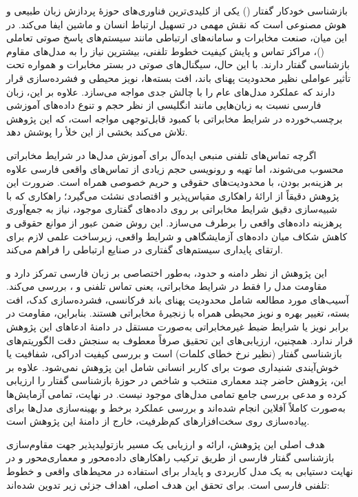 
بازشناسی خودکار گفتار () یکی از کلیدی‌ترین فناوری‌های حوزهٔ پردازش زبان طبیعی و هوش مصنوعی است که نقش مهمی در تسهیل ارتباط انسان و ماشین ایفا می‌کند. در این میان، صنعت مخابرات و سامانه‌های ارتباطی مانند سیستم‌های پاسخ صوتی تعاملی ()، مراکز تماس‌ و پایش کیفیت خطوط تلفنی، بیشترین نیاز را به مدل‌های مقاوم بازشناسی گفتار دارند. با این حال، سیگنال‌های صوتی در بستر مخابرات و  همواره تحت تأثیر عواملی نظیر محدودیت پهنای باند، افت بسته‌ها، نویز محیطی و فشرده‌سازی قرار دارند که عملکرد مدل‌های عام را با چالش جدی مواجه می‌سازد. علاوه بر این، زبان فارسی نسبت به زبان‌هایی مانند انگلیسی از نظر حجم و تنوع داده‌های آموزشی برچسب‌خورده در شرایط مخابراتی با کمبود قابل‌توجهی مواجه است، که این پژوهش تلاش می‌کند بخشی از این خلأ را پوشش دهد.

اگرچه تماس‌های تلفنی منبعی ایده‌آل برای آموزش مدل‌ها در شرایط مخابراتی محسوب می‌شوند، اما تهیه و رونویسی حجم زیادی از تماس‌های واقعی فارسی علاوه بر هزینه‌بر بودن، با محدودیت‌های حقوقی و حریم خصوصی همراه است. ضرورت این پژوهش دقیقاً از ارائهٔ راهکاری مقیاس‌پذیر و اقتصادی نشئت می‌گیرد؛ راهکاری که با شبیه‌سازی دقیق شرایط مخابراتی بر روی داده‌های گفتاری موجود، نیاز به جمع‌آوری پرهزینه داده‌های واقعی را برطرف می‌سازد. این روش ضمن عبور از موانع حقوقی و کاهش شکاف میان داده‌های آزمایشگاهی و شرایط واقعی، زیرساخت علمی لازم برای ارتقای پایداری سیستم‌های گفتاری در صنایع ارتباطی را فراهم می‌کند.

این پژوهش از نظر دامنه و حدود، به‌طور اختصاصی بر زبان فارسی تمرکز دارد و مقاومت مدل را فقط در شرایط مخابراتی، یعنی تماس تلفنی و ، بررسی می‌کند. آسیب‌های مورد مطالعه شامل محدودیت پهنای باند فرکانسی، فشرده‌سازی کدک، افت بسته، تغییر بهره و نویز محیطی همراه با زنجیرهٔ مخابراتی هستند. بنابراین، مقاومت در برابر نویز یا شرایط ضبط غیرمخابراتی به‌صورت مستقل در دامنهٔ ادعاهای این پژوهش قرار ندارد. همچنین، ارزیابی‌های این تحقیق صرفاً معطوف به سنجش دقت الگوریتم‌های بازشناسی گفتار (نظیر نرخ خطای کلمات) است و بررسی کیفیت ادراکی، شفافیت یا خوش‌آیندی شنیداری صوت برای کاربر انسانی شامل این پژوهش نمی‌شود. علاوه بر این، پژوهش حاضر چند معماری منتخب و شاخص در حوزهٔ بازشناسی گفتار را ارزیابی کرده و مدعی بررسی جامع تمامی مدل‌های موجود نیست. در نهایت، تمامی آزمایش‌ها به‌صورت کاملاً آفلاین انجام شده‌اند و بررسی عملکرد برخط و بهینه‌سازی مدل‌ها برای پیاده‌سازی روی سخت‌افزارهای کم‌ظرفیت، خارج از دامنه‌ٔ این پژوهش است.


هدف اصلی این پژوهش، ارائه و ارزیابی یک مسیر بازتولیدپذیر جهت مقاوم‌سازی بازشناسی گفتار فارسی از طریق ترکیب راهکارهای داده‌محور و معماری‌محور و در نهایت دستیابی به یک مدل کاربردی و پایدار برای استفاده در محیط‌های واقعی و خطوط تلفنی فارسی است. برای تحقق این هدف اصلی، اهداف جزئی زیر تدوین شده‌اند:

